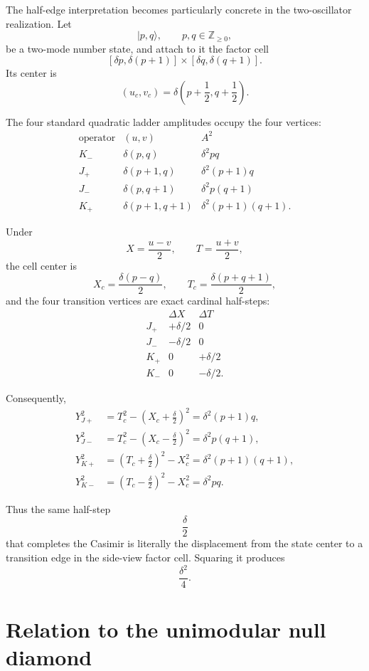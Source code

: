\documentclass[11pt]{article}
\theoremstyle{remark}
\begin{document}
The half-edge interpretation becomes particularly concrete in the two-oscillator realization.  Let
\[
|p,q\rangle,\qquad p,q\in\mathbb{Z}_{\ge0},
\]
be a two-mode number state, and attach to it the factor cell
\[
[\delta p,\delta(p+1)]
\times
[\delta q,\delta(q+1)].
\]
Its center is
\[
(u_c,v_c)
=
\delta\left(p+\frac12,q+\frac12\right).
\]

The four standard quadratic ladder amplitudes occupy the four vertices:
\[
\begin{array}{c|c|c}
\text{operator}&(u,v)&A^2\\
\hline
K_-&\delta(p,q)&\delta^2pq\\
J_+&\delta(p+1,q)&\delta^2(p+1)q\\
J_-&\delta(p,q+1)&\delta^2p(q+1)\\
K_+&\delta(p+1,q+1)&\delta^2(p+1)(q+1).
\end{array}
\]

Under
\[
X=\frac{u-v}{2},
\qquad
T=\frac{u+v}{2},
\]
the cell center is
\[
X_c=\frac{\delta(p-q)}{2},
\qquad
T_c=\frac{\delta(p+q+1)}{2},
\]
and the four transition vertices are exact cardinal half-steps:
\[
\begin{array}{c|cc}
&\Delta X&\Delta T\\
\hline
J_+&+\delta/2&0\\
J_-&-\delta/2&0\\
K_+&0&+\delta/2\\
K_-&0&-\delta/2.
\end{array}
\]

Consequently,
\begin{align*}
Y_{J+}^2
&=
T_c^2-\left(X_c+\frac{\delta}{2}\right)^2
=
\delta^2(p+1)q,\\
Y_{J-}^2
&=
T_c^2-\left(X_c-\frac{\delta}{2}\right)^2
=
\delta^2p(q+1),\\
Y_{K+}^2
&=
\left(T_c+\frac{\delta}{2}\right)^2-X_c^2
=
\delta^2(p+1)(q+1),\\
Y_{K-}^2
&=
\left(T_c-\frac{\delta}{2}\right)^2-X_c^2
=
\delta^2pq.
\end{align*}

Thus the same half-step
\[
\frac{\delta}{2}
\]
that completes the Casimir is literally the displacement from the state center to a transition edge in the side-view factor cell.  Squaring it produces
\[
\frac{\delta^2}{4}.
\]

\section{Relation to the unimodular null diamond}
\end{document}
